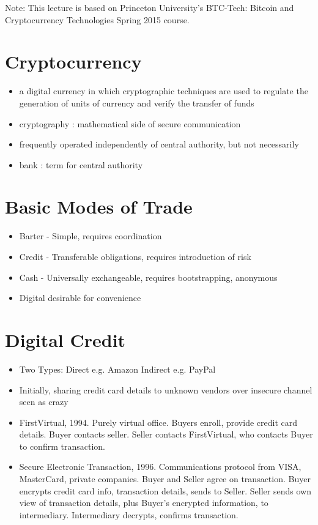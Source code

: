 \documentclass{article}
\begin{document}
\maketitle

Note: This lecture is based on Princeton University's BTC-Tech: Bitcoin and Cryptocurrency Technologies Spring 2015 course.

\section*{Cryptocurrency}
\begin{itemize}
\item a digital currency in which cryptographic techniques are used to regulate the generation of units of currency and verify the transfer of funds
\item cryptography : mathematical side of secure communication
\item frequently operated independently of central authority, but not necessarily
\item bank : term for central authority
\end{itemize}

\section*{Basic Modes of Trade}
\begin{itemize}
\item Barter - Simple, requires coordination
\item Credit - Transferable obligations, requires introduction of risk
\item Cash - Universally exchangeable, requires bootstrapping, anonymous
\item Digital desirable for convenience
\end{itemize}

\section*{Digital Credit}
\begin{itemize}
\item Two Types:
\subitem Direct e.g. Amazon
\subitem Indirect e.g. PayPal

\item Initially, sharing credit card details to unknown vendors over insecure channel seen as crazy

\item FirstVirtual, 1994. Purely virtual office. Buyers enroll, provide credit card details. Buyer contacts seller. Seller contacts FirstVirtual, who contacts Buyer to confirm transaction.

\item Secure Electronic Transaction, 1996. Communications protocol from VISA, MasterCard, private companies. Buyer and Seller agree on transaction. Buyer encrypts credit card info, transaction details, sends to Seller. Seller sends own view of transaction details, plus Buyer's encrypted information, to intermediary. Intermediary decrypts, confirms transaction.
\end{itemize}
\end{document}
